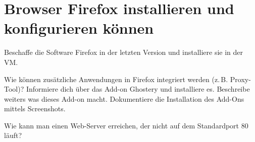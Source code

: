 \chapter{Browser Firefox installieren und konfigurieren können}
\label{kap:firefox}

\begin{aufgabe}
Beschaffe die Software Firefox in der letzten Version und installiere sie in der VM.
\end{aufgabe}

\begin{aufgabe}
Wie können zusätzliche Anwendungen in Firefox integriert werden (z.\,B. Proxy-Tool)? Informiere dich über das Add-on Ghostery und installiere es. Beschreibe weiters was dieses Add-on macht. Dokumentiere die Installation des Add-Ons mittels Screenshots.
\end{aufgabe}


\begin{aufgabe}
Wie kann man einen Web-Server erreichen, der nicht auf dem Standardport 80 läuft?
\end{aufgabe}

